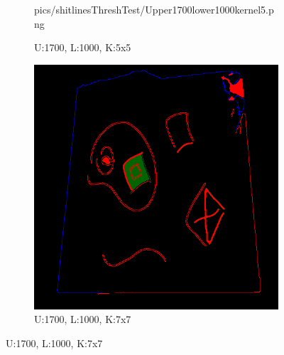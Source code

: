 \documentclass[11pt]{article}
\begin{document}
\begin{figure}[!h]
\begin{subfigure}[t]{.25\textwidth}
		{pics/shitlinesThreshTest/Upper1700lower1000kernel5.png}
		\caption{U:1700, L:1000, K:5x5}
	\end{subfigure}
\hfill
	\begin{subfigure}[t]{.25\textwidth}
		\centering
		\includegraphics[scale=0.3]
		{pics/shitlinesThreshTest/Upper1700lower1000kernel7.png}
		\caption{U:1700, L:1000, K:7x7}	
	\end{subfigure}



\end{figure}
\end{document}
